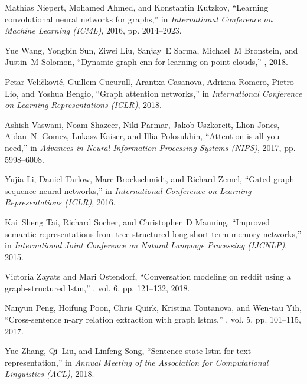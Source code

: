 \documentclass[conference]{IEEEtran}
\begin{document}
\begin{thebibliography}{10}
  Mathias Niepert, Mohamed Ahmed, and Konstantin Kutzkov,
  \newblock ``Learning convolutional neural networks for graphs,''
  \newblock in {\em International Conference on Machine Learning (ICML)}, 2016,
    pp. 2014--2023.
  
  Yue Wang, Yongbin Sun, Ziwei Liu, Sanjay~E Sarma, Michael~M Bronstein, and
    Justin~M Solomon,
  \newblock ``Dynamic graph cnn for learning on point clouds,''
  , 2018.
  
  Petar Veli{\v{c}}kovi{\'c}, Guillem Cucurull, Arantxa Casanova, Adriana Romero,
    Pietro Lio, and Yoshua Bengio,
  \newblock ``Graph attention networks,''
  \newblock in {\em International Conference on Learning Representations (ICLR)},
    2018.
  
  Ashish Vaswani, Noam Shazeer, Niki Parmar, Jakob Uszkoreit, Llion Jones,
    Aidan~N. Gomez, Lukasz Kaiser, and Illia Polosukhin,
  \newblock ``Attention is all you need,''
  \newblock in {\em Advances in Neural Information Processing Systems (NIPS)},
    2017, pp. 5998--6008.
  
  Yujia Li, Daniel Tarlow, Marc Brockschmidt, and Richard Zemel,
  \newblock ``Gated graph sequence neural networks,''
  \newblock in {\em International Conference on Learning Representations (ICLR)},
    2016.
  
  Kai~Sheng Tai, Richard Socher, and Christopher~D Manning,
  \newblock ``Improved semantic representations from tree-structured long
    short-term memory networks,''
  \newblock in {\em International Joint Conference on Natural Language Processing
    (IJCNLP)}, 2015.
  
  Victoria Zayats and Mari Ostendorf,
  \newblock ``Conversation modeling on reddit using a graph-structured lstm,''
  , vol. 6, pp. 121--132, 2018.
  
  Nanyun Peng, Hoifung Poon, Chris Quirk, Kristina Toutanova, and Wen-tau Yih,
  \newblock ``Cross-sentence n-ary relation extraction with graph lstms,''
  , vol. 5, pp. 101--115, 2017.
  
  Yue Zhang, Qi~Liu, and Linfeng Song,
  \newblock ``Sentence-state lstm for text representation,''
  \newblock in {\em Annual Meeting of the Association for Computational
    Linguistics (ACL)}, 2018.
  

\end{thebibliography}
\end{document}
